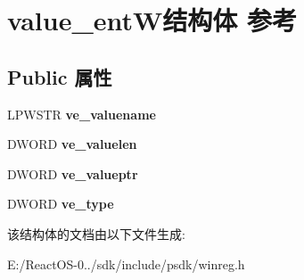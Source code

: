 \hypertarget{structvalue__ent_w}{}\section{value\+\_\+ent\+W结构体 参考}
\label{structvalue__ent_w}
\subsection*{Public 属性}
\begin{DoxyCompactItemize}
\item 
\mbox{\label{structvalue__ent_w_af79252f528b10a33ee7e7c78ddd5c4ef}} 
L\+P\+W\+S\+TR {\bfseries ve\+\_\+valuename}
\item 
\mbox{\label{structvalue__ent_w_ae1790c03d5c167711448e12073e73998}} 
D\+W\+O\+RD {\bfseries ve\+\_\+valuelen}
\item 
\mbox{\label{structvalue__ent_w_af5289e292aa50be894e4880df0098c2b}} 
D\+W\+O\+RD {\bfseries ve\+\_\+valueptr}
\item 
\mbox{\label{structvalue__ent_w_a9cd50db95ee8efc74997c167f64a4eef}} 
D\+W\+O\+RD {\bfseries ve\+\_\+type}
\end{DoxyCompactItemize}


该结构体的文档由以下文件生成\+:\begin{DoxyCompactItemize}
\item 
E\+:/\+React\+O\+S-\/0../sdk/include/psdk/winreg.\+h\end{DoxyCompactItemize}
